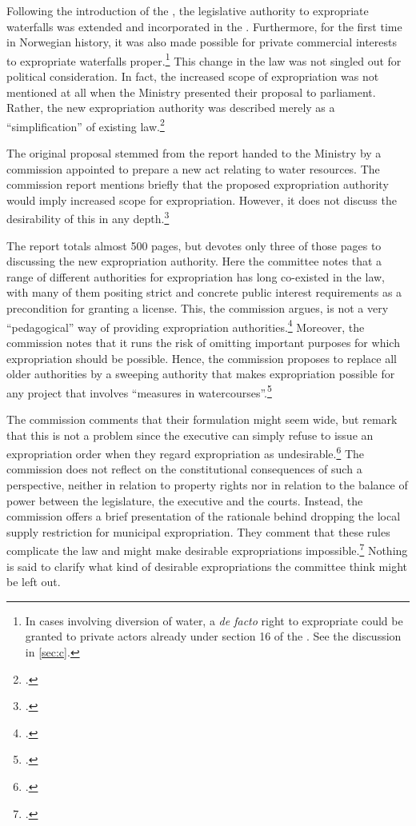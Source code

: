 Following the introduction of the \cite{wra00}, the legislative authority to expropriate waterfalls  was extended and incorporated in the \cite{ea59}. Furthermore, for the first time in Norwegian history, it was also made possible for private commercial interests to expropriate waterfalls proper.\footnote{In cases involving diversion of water, a {\it de facto} right to expropriate could be granted to private actors already under section 16 of the \cite{wra17}. See the discussion in \ref{sec:c}.} This change in the law was not singled out for political consideration. In fact, the increased scope of expropriation was not mentioned at all when the Ministry presented their proposal to parliament. Rather, the new expropriation authority was described merely as a ``simplification'' of existing law.\footcite[223-225]{otprp39}

The original proposal stemmed from the report handed to the Ministry by a commission appointed to prepare a new act relating to water resources. The commission report mentions briefly that the proposed expropriation authority would imply increased scope for expropriation. However, it does not discuss the desirability of this in any depth.\footcite[235-237]{nou94} 

The report totals almost 500 pages, but devotes only three of those pages to discussing the new expropriation authority. Here the committee notes that a range of different authorities for expropriation has long co-existed in the law, with many of them positing strict and concrete public interest requirements as a precondition for granting a license. This, the commission argues, is not a very ``pedagogical'' way of providing expropriation authorities.\footcite[235]{nou94} Moreover, the commission notes that it runs the risk of omitting important purposes for which expropriation should be possible. Hence, the commission proposes to replace all older authorities by a sweeping authority that makes expropriation possible for any project that involves ``measures in watercourses''.\footcite[235-236]{nou94}

The commission comments that their formulation might seem wide, but remark that this is not a problem since the executive can simply refuse to issue an expropriation order when they regard expropriation as undesirable.\footcite[235]{nou94} The commission does not reflect on the  constitutional consequences of such a perspective, neither in relation to property rights nor in relation to the balance of power between the legislature, the executive and the courts. Instead, the commission offers a brief presentation of the rationale behind dropping the local supply restriction for municipal expropriation. They comment that these rules complicate the law and might make desirable expropriations impossible.\footcite[235]{nou94} Nothing is said to clarify what kind of desirable expropriations the committee think might be left out. 

